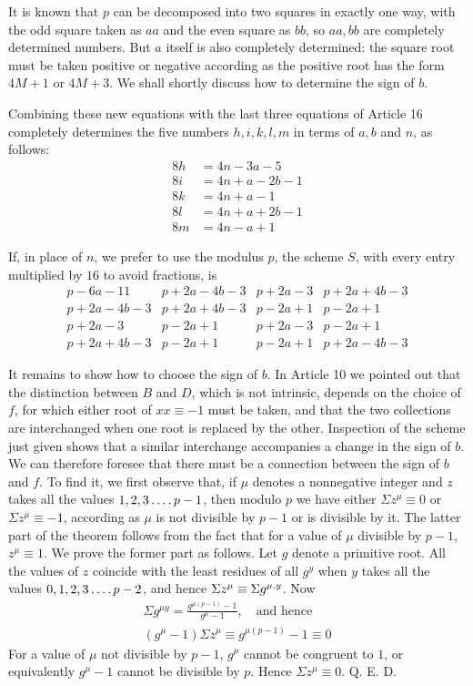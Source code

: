 It is known that $p$ can be decomposed into two squares in exactly one way, with the odd square taken as $aa$ and the even square as $bb$, so $aa,bb$ are completely determined numbers. But $a$ itself is also completely determined: the square root must be taken positive or negative according as the positive root has the form $4M+1$ or $4M+3$. We shall shortly discuss how to determine the sign of $b$.

Combining these new equations with the last three equations of Article 16 completely determines the five numbers $h,i,k,l,m$ in terms of $a,b$ and $n$, as follows:
%
\[
\begin{aligned}
8h&=4n-3a-5\\
8i&=4n+a-2b-1\\
8k&=4n+a-1\\
8l&=4n+a+2b-1\\
8m&=4n-a+1
\end{aligned}
\]

If, in place of $n$, we prefer to use the modulus $p$, the scheme $S$, with every entry multiplied by $16$ to avoid fractions, is
\[
\begin{array}{l|l|l|l}
p-6a-11&p+2a-4b-3&p+2a-3&p+2a+4b-3\\
p+2a-4b-3&p+2a+4b-3&p-2a+1&p-2a+1\\
p+2a-3&p-2a+1&p+2a-3&p-2a+1\\
p+2a+4b-3&p-2a+1&p-2a+1&p+2a-4b-3
\end{array}
\]

It remains to show how to choose the sign of $b$. In Article 10 we pointed out that the distinction between $B$ and $D$, which is not intrinsic, depends on the choice of $f$, for which either root of $xx\equiv-1$ must be taken, and that the two collections are interchanged when one root is replaced by the other. Inspection of the scheme just given shows that a similar interchange accompanies a change in the sign of $b$. We can therefore foresee that there must be a connection between the sign of $b$ and $f$. To find it, we first observe that, if $\mu$ denotes a nonnegative integer and $z$ takes all the values $1,2,3\mathinner{.\,.\,.\,.} p-1$, then modulo $p$ we have either $\Sigma z^\mu\equiv0$ or $\Sigma z^\mu\equiv-1$, according as $\mu$ is not divisible by $p-1$ or is divisible by it. The latter part of the theorem follows from the fact that for a value of $\mu$ divisible by $p-1$, $z^\mu\equiv1$. We prove the former part as follows. Let $g$ denote a primitive root. All the values of $z$ coincide with the least residues of all $g^y$ when $y$ takes all the values $0,1,2,3\mathinner{.\,.\,.\,.} p-2$, and hence $\Sigma z^\mu\equiv\Sigma g^{\mu\mathbin{.} y}$. Now
\[
\begin{gathered}
\Sigma g^{\mu y}=\frac{g^{\mu(p-1)}-1}{g^\mu-1},\quad\text{and hence}\\
(g^\mu-1)\Sigma z^\mu\equiv g^{\mu(p-1)}-1\equiv0
\end{gathered}
\]
For a value of $\mu$ not divisible by $p-1$, $g^\mu$ cannot be congruent to $1$, or equivalently $g^\mu-1$ cannot be divisible by $p$. Hence $\Sigma z^\mu\equiv0$. Q. E. D.

